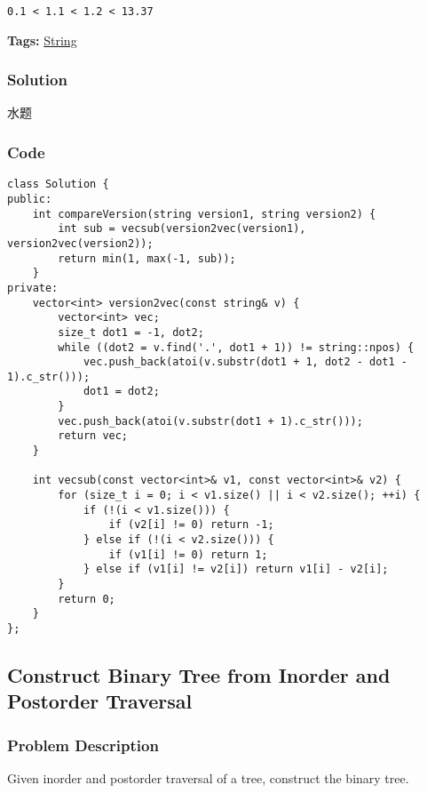 \documentclass{article}
\begin{document}
\begin{CJK*}{UTF8}{gkai}
\begin{verbatim}
0.1 < 1.1 < 1.2 < 13.37
\end{verbatim}

\textbf{Tags: }
\hyperref[ String ]{ String }



\subsubsection*{Solution}
水题

\subsubsection*{Code}
\begin{lstlisting}
class Solution {
public:
    int compareVersion(string version1, string version2) {
        int sub = vecsub(version2vec(version1), version2vec(version2));
        return min(1, max(-1, sub));
    }
private:
    vector<int> version2vec(const string& v) {
        vector<int> vec;
        size_t dot1 = -1, dot2;
        while ((dot2 = v.find('.', dot1 + 1)) != string::npos) {
            vec.push_back(atoi(v.substr(dot1 + 1, dot2 - dot1 - 1).c_str()));
            dot1 = dot2;
        }
        vec.push_back(atoi(v.substr(dot1 + 1).c_str()));
        return vec;
    }
    
    int vecsub(const vector<int>& v1, const vector<int>& v2) {
        for (size_t i = 0; i < v1.size() || i < v2.size(); ++i) {
            if (!(i < v1.size())) {
                if (v2[i] != 0) return -1;
            } else if (!(i < v2.size())) {
                if (v1[i] != 0) return 1;
            } else if (v1[i] != v2[i]) return v1[i] - v2[i];
        }
        return 0;
    }
}; 
\end{lstlisting}


\subsection{ Construct Binary Tree from Inorder and Postorder Traversal }
\label{ Construct Binary Tree from Inorder and Postorder Traversal }

\subsubsection*{Problem Description}
Given inorder and postorder traversal of a tree, construct the binary tree.


\end{CJK*}
\end{document}
